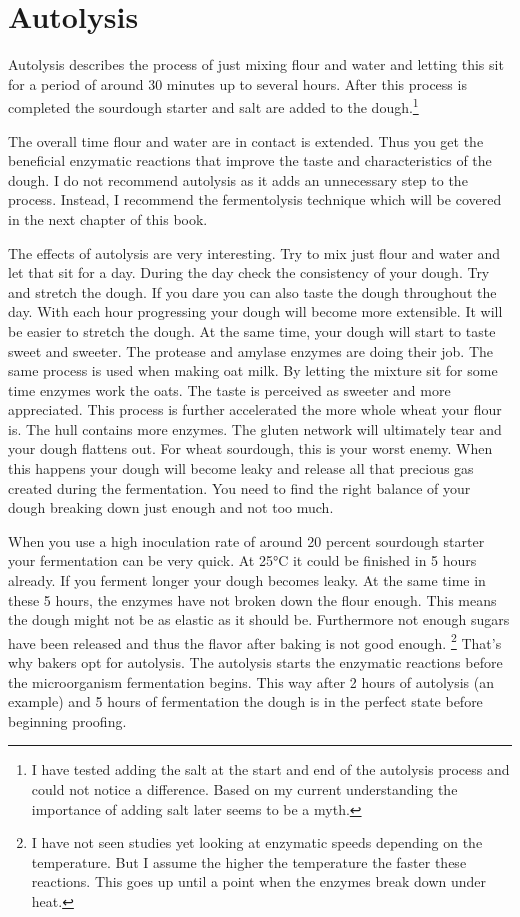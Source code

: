 \section{Autolysis}

Autolysis describes the process of just mixing flour and water and letting
this sit for a period of around 30 minutes up to several hours. After this
process is completed the sourdough starter and salt are added to the
dough.\footnote{I have tested adding the salt at the start and end of the
autolysis process and could not notice a difference. Based on my current
understanding the importance of adding salt later seems to be a myth.}

The overall time flour and water are in contact is extended. Thus you get the
beneficial enzymatic reactions that improve the taste and characteristics of the
dough. I do not recommend autolysis as it adds an unnecessary step to the
process. Instead, I recommend the fermentolysis technique which will be covered in the
next chapter of this book.

The effects of autolysis are very interesting. Try to mix just flour and
water and let that sit for a day. During the day check the consistency of
your dough. Try and stretch the dough. If you dare you can also taste the
dough throughout the day. With each hour progressing your dough will become
more extensible. It will be easier to stretch the dough. At the same time, your
dough will start to taste sweet and sweeter. The protease and amylase enzymes
are doing their job. The same process is used when making oat milk. By letting
the mixture sit for some time enzymes work the oats. The taste is perceived as
sweeter and more appreciated. This process is further accelerated the more
whole wheat your flour is. The hull contains more enzymes. The gluten network
will ultimately tear and your dough flattens out. For wheat sourdough, this is
your worst enemy. When this happens your dough will become leaky and release
all that precious gas created during the fermentation. You need to find the
right balance of your dough breaking down just enough and not too much.

When you use a high inoculation rate of around 20 percent sourdough starter
your fermentation can be very quick. At 25°C it could be finished in 5 hours
already. If you ferment longer your dough becomes leaky. At the same time in
these 5 hours, the enzymes have not broken down the flour enough. This means
the dough might not be as elastic as it should be. Furthermore not enough
sugars have been released and thus the flavor after baking is not good enough.
\footnote{I have not seen studies yet looking at enzymatic speeds depending on
the temperature. But I assume the higher the temperature the faster these
reactions. This goes up until a point when the enzymes break down under
heat.} That's why bakers opt for autolysis. The autolysis starts the enzymatic
reactions before the microorganism fermentation begins. This way after 2 hours
of autolysis (an example) and 5 hours of fermentation the dough is in the
perfect state before beginning proofing.

